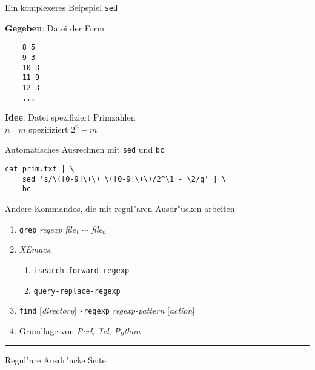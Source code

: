 \begin{slide}{}
\normalsize
\begin{center}
Ein komplexeres Beipspiel \texttt{sed}
\end{center}

\footnotesize
\textbf{Gegeben}: Datei der Form
\begin{verbatim}
    8 5
    9 3
    10 3
    11 9
    12 3
    ...
\end{verbatim}
\textbf{Idee}: Datei spezifiziert Primzahlen \\[0.3cm]
\hspace*{1.3cm} $n\quad m$ \quad spezifiziert $2^n - m$ 

Automatisches Ausrechnen mit \texttt{sed} und \texttt{bc}
\begin{verbatim}
cat prim.txt | \
    sed 's/\([0-9]\+\) \([0-9]\+\)/2^\1 - \2/g' | \
    bc
\end{verbatim}

Andere Kommandos, die mit regul"aren Ausdr"ucken arbeiten
\begin{enumerate}
 \item \texttt{grep} \textsl{regexp} \textsl{file}$_1$ $\cdots$ \textsl{file$_n$}
\item \textsl{XEmacs}:
      \begin{enumerate}
      \item \texttt{isearch-forward-regexp}
      \item \texttt{query-replace-regexp}
      \end{enumerate}
\item \texttt{find} [\textsl{directory}] \texttt{-regexp} \textsl{regexp-pattern} [\emph{action}]
\item Grundlage von \textsl{Perl}, \textsl{Tcl}, \textsl{Python}
\end{enumerate}

\setcounter{page}{1}
\vspace*{\fill}
\tiny \addtocounter{mypage}{1}
\rule{17cm}{1mm}
Regul"are Ausdr"ucke  \hspace*{\fill} Seite 
\end{slide}











